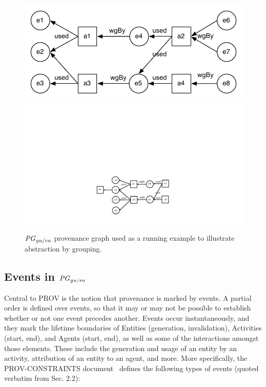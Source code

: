 \begin{figure}
\centering
\includegraphics[scale=.6]{figures/baseline-ug-ae.pdf} 
\includegraphics[scale=.6]{reworked-fig5.pdf} 
\caption{$\mathit{PG}_{gu/ea}$ provenance graph used as a running example to illustrate abstraction by grouping.}  \label{fig:baseline-ug-ae}
\end{figure}

\subsection{Events in $\mathit{PG}_{gu/ea}$}

\label{sec:events}

Central to PROV is the notion that provenance is marked by events. A partial order is defined over events, so that it may or may not be possible to establish whether or not one event precedes another. 
%
Events occur instantaneously, and they mark the lifetime boundaries of Entities (generation, invalidation), Activities (start, end), and Agents (start, end), as well as some of the interactions amongst those elements. These include the generation and usage of an entity by an activity, attribution of an entity to an agent, and more. More specifically, the PROV-CONSTRAINTS document~\citep{w3c-prov-constraints} defines the following types of events (quoted verbatim from Sec. 2.2):

